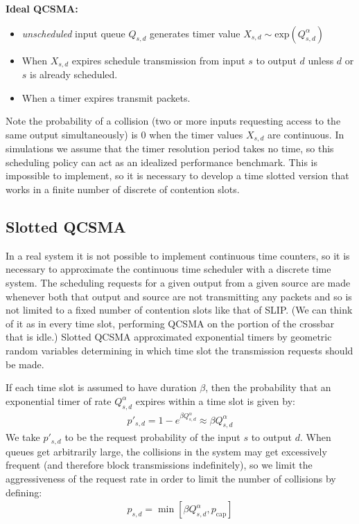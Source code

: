 \documentclass[11pt]{article}%
\begin{document}
{\bf Ideal QCSMA:}
\begin{itemize}
\item {\it unscheduled} input queue $Q_{s,d}$ generates timer value $X_{s,d}\sim \text{exp}(Q_{s,d}^\alpha)$
\item When $X_{s,d}$ expires schedule transmission from input $s$ to output $d$ unless $d$ or $s$ is already scheduled.
\item When a timer expires transmit packets.\\
\end{itemize}

Note the probability of a collision (two or more inputs requesting access to the same output simultaneously) is 0 when the timer values $X_{s,d}$ are continuous.  In simulations we assume that the timer resolution period takes no time, so this scheduling policy can act as an idealized performance benchmark.  This is impossible to implement, so it is necessary to develop a time slotted version that works in a finite number of discrete of contention slots.%

\subsection{Slotted QCSMA} \label{naive_qcsma}


In a real system it is not possible to implement continuous time counters, so it is necessary to approximate the continuous time scheduler with a discrete time system.  The scheduling requests for a given output from a given source are made whenever both that output and source are not transmitting any packets and so is not limited to a fixed number of contention slots like that of SLIP.  (We can think of it as in every time slot, performing QCSMA on the portion of the crossbar that is idle.)  Slotted QCSMA approximated exponential timers by geometric random variables determining in which time slot the transmission requests should be made.

If each time slot is assumed to have duration $\beta$, then the probability that an exponential timer of rate $Q_{s,d}^\alpha$ expires within a time slot is given by:
\begin{align}
p'_{s,d} =1-e^{\beta Q_{s,d}^\alpha} \approx \beta Q_{s,d}^\alpha
\end{align}
We take $p'_{s,d}$ to be the request probability of the input $s$ to output $d$.  When queues get arbitrarily large, the collisions in the system may get excessively frequent (and therefore block transmissions indefinitely), so we limit the aggressiveness of the request rate in order to limit the number of collisions by defining:
\begin{align}  \label{geo_p}
p_{s,d} =\min \left[ \beta Q_{s,d}^\alpha,p_{\text{cap}}\right]
\end{align}
\end{document}
